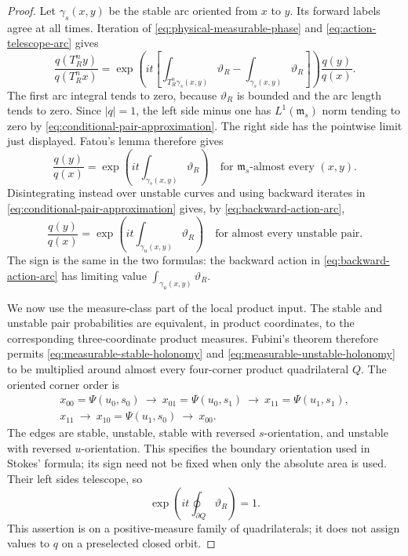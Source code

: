\begin{proof}
Let $\gamma_s(x,y)$ be the stable arc oriented from $x$ to $y$.
Its forward labels agree at all times. Iteration of
\eqref{eq:physical-measurable-phase} and
\eqref{eq:action-telescope-arc} gives
\[
 \frac{q(T_R^ny)}{q(T_R^nx)}
 =\exp\!\left(it\left[\int_{T_R^n\gamma_s(x,y)}\vartheta_R
                         -\int_{\gamma_s(x,y)}\vartheta_R\right]\right)
                         \frac{q(y)}{q(x)}.
\]
The first arc integral tends to zero, because $\vartheta_R$ is bounded
and the arc length tends to zero. Since $|q|=1$, the left side minus one
has $L^1(\mathfrak m_s)$ norm tending to zero by
\eqref{eq:conditional-pair-approximation}. The right side has the
pointwise limit just displayed. Fatou's lemma therefore gives
\begin{equation}\label{eq:measurable-stable-holonomy}
 \frac{q(y)}{q(x)}
       =\exp\!\left(it\int_{\gamma_s(x,y)}\vartheta_R\right)
       \quad\text{for }\mathfrak m_s\text{-almost every }(x,y).
\end{equation}
Disintegrating instead over unstable curves and using backward iterates
in \eqref{eq:conditional-pair-approximation} gives, by
\eqref{eq:backward-action-arc},
\begin{equation}\label{eq:measurable-unstable-holonomy}
 \frac{q(y)}{q(x)}
       =\exp\!\left(it\int_{\gamma_u(x,y)}\vartheta_R\right)
       \quad\text{for almost every unstable pair}.
\end{equation}
The sign is the same in the two formulas: the backward action in
\eqref{eq:backward-action-arc} has limiting value
$\int_{\gamma_u(x,y)}\vartheta_R$.

We now use the measure-class part of the local product input. The stable
and unstable pair probabilities are equivalent, in product coordinates,
to the corresponding three-coordinate product measures. Fubini's theorem
therefore permits \eqref{eq:measurable-stable-holonomy} and
\eqref{eq:measurable-unstable-holonomy} to be multiplied around almost
every four-corner product quadrilateral $Q$. The oriented corner order is
\begin{gather*}
 x_{00}=\Psi(u_0,s_0)\ \longrightarrow\
 x_{01}=\Psi(u_0,s_1)\ \longrightarrow\ x_{11}=\Psi(u_1,s_1),\\
 x_{11}\ \longrightarrow\ x_{10}=\Psi(u_1,s_0)
            \ \longrightarrow\ x_{00}.
\end{gather*}
The edges are stable, unstable, stable with reversed $s$-orientation,
and unstable with reversed $u$-orientation. This specifies the boundary
orientation used in Stokes' formula; its sign need not be fixed when
only the absolute area is used. Their left sides telescope, so
\begin{equation}\label{eq:measurable-area-obstruction}
 \exp\!\left(it\oint_{\partial Q}\vartheta_R\right)=1.
\end{equation}
This assertion is on a positive-measure family of quadrilaterals; it does
not assign values to $q$ on a preselected closed orbit.


\end{proof}
